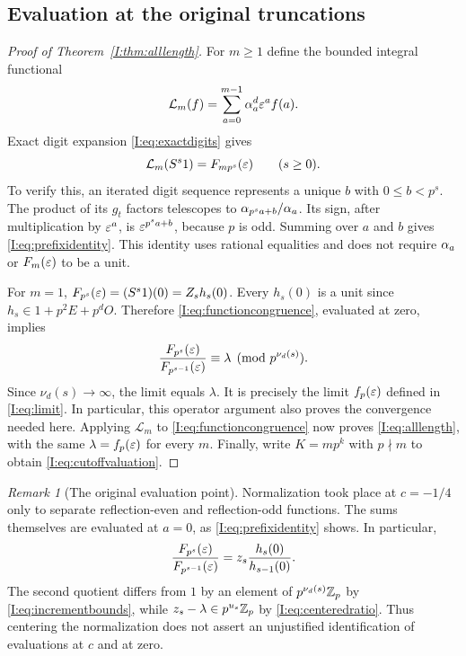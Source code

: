 \documentclass[11pt,letterpaper]{article}
\theoremstyle{definition}
\theoremstyle{remark}
\newtheorem{remark}[theorem]{Remark}
\begin{document}
\subsection{Evaluation at the original truncations}

\begin{proof}[Proof of Theorem~\ref{I:thm:alllength}]
For $m\ge1$ define the bounded integral functional
\[
 \mathcal L_m(f)=\sum_{a=0}^{m-1}\alpha_a^d\varepsilon^a f(a).
\]
Exact digit expansion \eqref{I:eq:exactdigits} gives
\begin{equation}\label{I:eq:prefixidentity}
 \mathcal L_m(S^s1)=F_{mp^s}(\varepsilon)\qquad(s\ge0).
\end{equation}
To verify this, an iterated digit sequence represents a unique
$b$ with $0\le b<p^s$.  The product of its $g_t$ factors telescopes
to $\alpha_{p^sa+b}/\alpha_a$.  Its sign, after multiplication by
$\varepsilon^a$, is $\varepsilon^{p^sa+b}$, because $p$ is odd.
Summing over $a$ and $b$ gives \eqref{I:eq:prefixidentity}.
This identity uses rational equalities and does not require
$\alpha_a$ or $F_m(\varepsilon)$ to be a unit.

For $m=1$, $F_{p^s}(\varepsilon)=(S^s1)(0)=Z_sh_s(0)$.
Every $h_s(0)$ is a unit since $h_s\in1+p^2E+p^dO$.
Therefore \eqref{I:eq:functioncongruence}, evaluated at zero, implies
\[
 \frac{F_{p^s}(\varepsilon)}{F_{p^{s-1}}(\varepsilon)}
       \equiv\lambda\pmod{p^{\nu_d(s)}}.
\]
Since $\nu_d(s)\to\infty$, the limit equals $\lambda$.
It is precisely the limit $f_p(\varepsilon)$ defined in
\eqref{I:eq:limit}.  In particular, this operator argument also proves
the convergence needed here.
Applying $\mathcal L_m$ to \eqref{I:eq:functioncongruence} now proves
\eqref{I:eq:alllength}, with the same $\lambda=f_p(\varepsilon)$ for every $m$.
Finally, write $K=mp^k$ with $p\nmid m$ to obtain
\eqref{I:eq:cutoffvaluation}.
\end{proof}

\begin{remark}[The original evaluation point]
Normalization took place at $c=-1/4$ only to separate reflection-even
and reflection-odd functions.  The sums themselves are evaluated at
$a=0$, as \eqref{I:eq:prefixidentity} shows.  In particular,
\[
 \frac{F_{p^s}(\varepsilon)}{F_{p^{s-1}}(\varepsilon)}
     =z_s\frac{h_s(0)}{h_{s-1}(0)}.
\]
The second quotient differs from $1$ by an element of
$p^{\nu_d(s)}\mathbb Z_p$ by \eqref{I:eq:incrementbounds}, while
$z_s-\lambda\in p^{u_s}\mathbb Z_p$ by \eqref{I:eq:centeredratio}.
Thus centering the normalization does not assert an unjustified
identification of evaluations at $c$ and at zero.
\end{remark}
\end{document}
